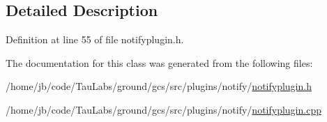 \subsection{\-Detailed \-Description}


\-Definition at line 55 of file notifyplugin.\-h.



\-The documentation for this class was generated from the following files\-:\begin{DoxyCompactItemize}
\item 
/home/jb/code/\-Tau\-Labs/ground/gcs/src/plugins/notify/\hyperlink{notifyplugin_8h}{notifyplugin.\-h}\item 
/home/jb/code/\-Tau\-Labs/ground/gcs/src/plugins/notify/\hyperlink{notifyplugin_8cpp}{notifyplugin.\-cpp}\end{DoxyCompactItemize}
